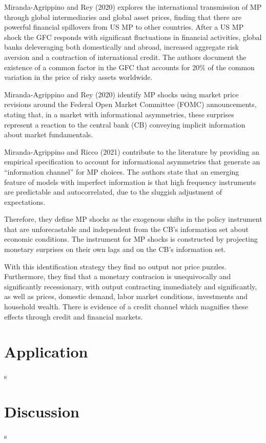 \documentclass[10pt,a4paper,draft]{article}
\begin{document}



Miranda-Agrippino and Rey (2020) explores the international transmission of MP through global intermediaries and global asset prices, finding that there are powerful financial spillovers from US MP to other countries. After a US MP shock the GFC responds with significant fluctuations in financial activities, global banks deleveraging both domestically and abroad, increased aggregate risk aversion and a contraction of international credit. The authors document the existence of a common factor in the GFC that accounts for 20\% of the common variation in the price of risky assets worldwide.

Miranda-Agrippino and Rey (2020) identify MP shocks using market price revisions around the Federal Open Market Committee (FOMC) announcements, stating that, in a market with informational asymmetries, these surprises represent a reaction to the central bank (CB) conveying implicit information about market fundamentals.

    

Miranda-Agrippino and Ricco (2021) contribute to the literature by providing an empirical specification to account for informational asymmetries that generate an \enquote{information channel} for MP choices. The authors state that an emerging feature of models with imperfect information is that high frequency instruments are predictable and autocorrelated, due to the sluggish adjustment of expectations. 

Therefore, they define MP shocks as the exogenous shifts in the policy instrument that are unforecastable and independent from the CB's information set about economic conditions. The instrument for MP shocks is constructed by projecting monetary surprises on their own lags and on the CB's information set. 

With this identification strategy they find no output nor price puzzles. Furthermore, they find that a monetary contracion is unequivocally and significantly recessionary, with output contracting immediately and significantly, as well as prices, domestic demand, labor market conditions, investments and household wealth. There is evidence of a credit channel which magnifies these effects through credit and financial markets. 






\section{Application}
s


\section{Discussion}


s
\end{document}
